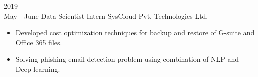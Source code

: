 \documentclass[9pt]{developercv} %
\begin{document}
\begin{entrylist}
{\begin{itemize}[noitemsep,topsep=0pt,parsep=0pt,partopsep=0pt, leftmargin=-1pt]
        \end{itemize}
    }
    \entry
    {2019\\\footnotesize{May - June}}
    {Data Scientist Intern}
    {SysCloud Pvt. Technologies Ltd.}
    {\vspace{-10pt}
    \small
        \begin{itemize}[noitemsep,topsep=0pt,parsep=0pt,partopsep=0pt, leftmargin=-1pt]
            \item Developed cost optimization techniques for backup and restore of G-suite and Office 365 files.
            \item Solving phishing email detection problem using combination of NLP and Deep learning.
        \end{itemize}
    }
\end{entrylist}
\end{document}
